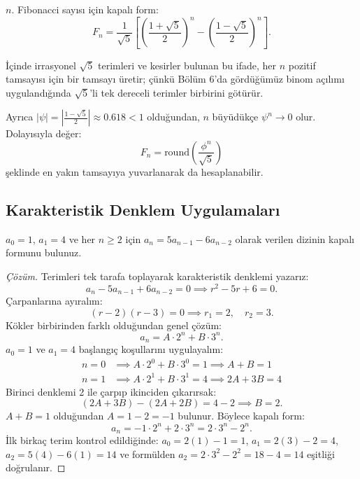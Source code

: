 \begin{theorem}
$n$. Fibonacci sayısı için kapalı form:
\[
F_n = \frac{1}{\sqrt{5}} \left[ \left(\frac{1+\sqrt{5}}{2}\right)^n - \left(\frac{1-\sqrt{5}}{2}\right)^n \right].
\]
\end{theorem}

İçinde irrasyonel $\sqrt{5}$ terimleri ve kesirler bulunan bu ifade, her $n$ pozitif tamsayısı için bir tamsayı üretir; çünkü Bölüm 6'da gördüğümüz binom açılımı uygulandığında $\sqrt{5}$'li tek dereceli terimler birbirini götürür.

Ayrıca $|\psi| = |\frac{1-\sqrt{5}}{2}| \approx 0.618 < 1$ olduğundan, $n$ büyüdükçe $\psi^n \to 0$ olur. Dolayısıyla değer:
\[
F_n = \text{round}\left( \frac{\phi^n}{\sqrt{5}} \right)
\]
şeklinde en yakın tamsayıya yuvarlanarak da hesaplanabilir.

\subsection{Karakteristik Denklem Uygulamaları}

\begin{example}
$a_0 = 1$, $a_1 = 4$ ve her $n \ge 2$ için $a_n = 5a_{n-1} - 6a_{n-2}$ olarak verilen dizinin kapalı formunu bulunuz.
\end{example}

\begin{proof}[Çözüm]
Terimleri tek tarafa toplayarak karakteristik denklemi yazarız:
\[
a_n - 5a_{n-1} + 6a_{n-2} = 0 \implies r^2 - 5r + 6 = 0.
\]
Çarpanlarına ayıralım:
\[
(r - 2)(r - 3) = 0 \implies r_1 = 2, \quad r_2 = 3.
\]
Kökler birbirinden farklı olduğundan genel çözüm:
\[
a_n = A \cdot 2^n + B \cdot 3^n.
\]
$a_0 = 1$ ve $a_1 = 4$ başlangıç koşullarını uygulayalım:
\begin{align*}
n = 0 &\implies A \cdot 2^0 + B \cdot 3^0 = 1 \implies A + B = 1 \\
n = 1 &\implies A \cdot 2^1 + B \cdot 3^1 = 4 \implies 2A + 3B = 4
\end{align*}
Birinci denklemi 2 ile çarpıp ikinciden çıkarırsak:
\[
(2A + 3B) - (2A + 2B) = 4 - 2 \implies B = 2.
\]
$A + B = 1$ olduğundan $A = 1 - 2 = -1$ bulunur.
Böylece kapalı form:
\[
a_n = -1 \cdot 2^n + 2 \cdot 3^n = 2 \cdot 3^n - 2^n.
\]
İlk birkaç terim kontrol edildiğinde:
$a_0 = 2(1) - 1 = 1$,
$a_1 = 2(3) - 2 = 4$,
$a_2 = 5(4) - 6(1) = 14$ ve formülden $a_2 = 2 \cdot 3^2 - 2^2 = 18 - 4 = 14$ eşitliği doğrulanır.
\end{proof}


